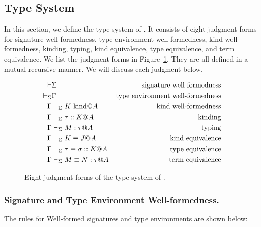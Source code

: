 
\subsection{Type System}

In this section, we define the type system of \LMD.
It consists of eight judgment forms for signature well-formedness, type environment well-formedness, kind well-formedness, kinding, typing, kind equivalence, type equivalence, and term equivalence.
We list the judgment forms in Figure~\ref{fig:LMD-six-judgments}.
They are all defined in a mutual recursive manner.  We will discuss
each judgment below.

\begin{figure}[tbp]
  \begin{center}
    \begin{align*}
      \vdash & \Sigma                     & \text{signature well-formedness}        \\
      \vdash_\Sigma     & \Gamma                         & \text{type environment well-formedness} \\
      \Gamma     & \vdash_\Sigma K \text{\ kind} @ A           & \text{kind well-formedness}             \\
      \Gamma     & \vdash_\Sigma \tau :: K @ A           & \text{kinding}                          \\
      \Gamma     & \vdash_\Sigma M : \tau @ A            & \text{typing}                           \\
      \Gamma     & \vdash_\Sigma K \equiv J @ A              & \text{kind equivalence}                 \\
      \Gamma     & \vdash_\Sigma \tau \equiv \sigma :: K @ A & \text{type equivalence}                 \\
      \Gamma     & \vdash_\Sigma M \equiv N : \tau @ A       & \text{term equivalence}
    \end{align*}
    \caption{Eight judgment forms of the type system of \LMD.}
    \label{fig:LMD-six-judgments}
  \end{center}
\end{figure}


\subsubsection{Signature and Type Environment Well-formedness.}
The rules for Well-formed signatures and type environments are
shown below:
%
{\small
\begin{center}
  \infrule{
  }{
    \vdash \emptyset
  }
  \hfil
  \hfil
  \\[2mm]
  \infrule{
  }{
    \V \emptyset
  }
  \hfil
\end{center}
}

